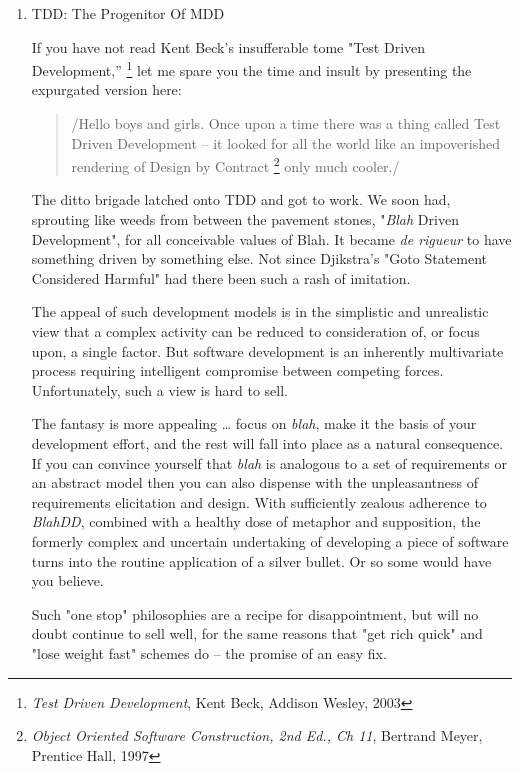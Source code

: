\documentclass{article}
\begin{document}
\begin{enumerate}
\item TDD: The Progenitor Of MDD
\label{sec:orgheadline179}

If you have not read Kent Beck's insufferable tome "Test Driven
Development,” \footnote{\emph{Test Driven Development}, Kent Beck, Addison Wesley, 2003} let me spare you the time and insult by presenting
the expurgated version here:

\begin{quote}
/Hello boys and girls. Once upon a time there was a thing called Test
Driven Development -- it looked for all the world like an impoverished
rendering of Design by Contract \footnote{\emph{Object Oriented Software Construction, 2nd Ed., Ch 11}, Bertrand
Meyer, Prentice Hall, 1997} only much cooler./
\end{quote}

The ditto brigade latched onto TDD and got to work. We soon had,
sprouting like weeds from between the pavement stones, "\emph{Blah} Driven
Development", for all conceivable values of Blah. It became \emph{de rigueur}
to have something driven by something else. Not since Djikstra's "Goto
Statement Considered Harmful" had there been such a rash of imitation.

The appeal of such development models is in the simplistic and
unrealistic view that a complex activity can be reduced to consideration
of, or focus upon, a single factor. But software development is an
inherently multivariate process requiring intelligent compromise between
competing forces. Unfortunately, such a view is hard to sell.

The fantasy is more appealing \ldots{} focus on \emph{blah}, make it the basis of
your development effort, and the rest will fall into place as a natural
consequence. If you can convince yourself that \emph{blah} is analogous to a
set of requirements or an abstract model then you can also dispense with
the unpleasantness of requirements elicitation and design. With
sufficiently zealous adherence to \emph{BlahDD}, combined with a healthy dose
of metaphor and supposition, the formerly complex and uncertain
undertaking of developing a piece of software turns into the routine
application of a silver bullet. Or so some would have you believe.

Such "one stop" philosophies are a recipe for disappointment, but will
no doubt continue to sell well, for the same reasons that "get rich
quick" and "lose weight fast" schemes do -- the promise of an easy fix.


\end{enumerate}
\end{document}
